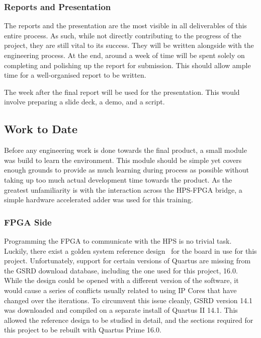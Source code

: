 \subsubsection{\textbf{Reports and Presentation}}
The reports and the presentation are the most visible in all deliverables of
this entire process.
As such, while not directly contributing to the progress of the project,
they are still vital to its success.
They will be written alongside with the engineering process.
At the end, around a week of time will be spent solely on completing and
polishing up the report for submission.
This should allow ample time for a well-organised report to be written.

The week after the final report will be used for the presentation.
This would involve preparing a slide deck, a demo, and a script.

\subsection{Work to Date}

Before any engineering work is done towards the final product, a small module
was build to learn the environment.
This module should be simple yet covers enough grounds to provide as much
learning during process as possible without taking up too much actual
development time towards the product.
As the greatest unfamiliarity is with the interaction across the HPS-FPGA
bridge, a simple hardware accelerated adder was used for this training.

\subsubsection{\textbf{FPGA Side}}
Programming the FPGA to communicate with the HPS is no trivial task.
Luckily, there exist a golden system reference design~\cite{Rocket1} for
the board in use for this project.
Unfortunately, support for certain versions of Quartus are missing from
the GSRD download database, including the one used for this project, 16.0.
While the design could be opened with a different version of the software,
it would cause a series of conflicts usually related to using IP Cores that
have changed over the iterations.
To circumvent this issue cleanly, GSRD version 14.1 was downloaded and compiled
on a separate install of Quartus II 14.1.
This allowed the reference design to be studied in detail, and the sections
required for this project to be rebuilt with Quartus Prime 16.0.

